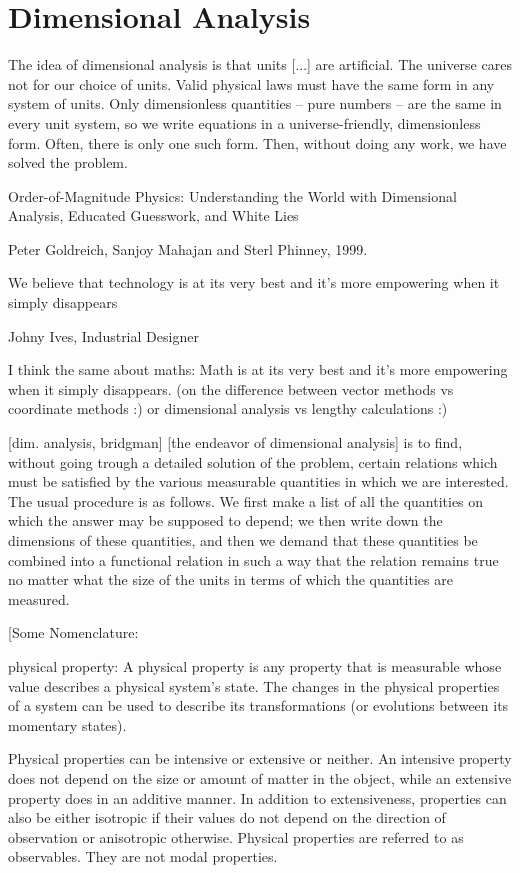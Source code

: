 \section{Dimensional Analysis}

\epigraph{The idea of dimensional analysis is that units [...] are artificial. The universe cares not for our choice of units. Valid physical laws must have the same form in any system of units. Only dimensionless quantities -- pure numbers -- are the same in every unit system, so we write equations in a universe-friendly, dimensionless form. Often, there is only one such form. Then, without doing any work, we have solved the problem.}
{Order-of-Magnitude Physics: Understanding the World with Dimensional Analysis, Educated Guesswork, and White Lies}
{Peter Goldreich, Sanjoy Mahajan and Sterl Phinney, 1999.}

\epigraph{We believe that technology is at its very best and it's more empowering when it simply disappears}
{Johny Ives, Industrial Designer}{}

I think the same about maths: Math is at its very best and it's more empowering when it simply disappears. (on the difference between vector methods vs coordinate methods :) or dimensional analysis vs lengthy calculations :)

[dim. analysis, bridgman]
[the endeavor of dimensional analysis] is to find, without going trough a detailed solution of the problem, certain relations which must be satisfied by the various measurable quantities in which we are interested. The usual procedure is as follows. We first make a list of all the quantities on which the answer may be supposed to depend; we then write down the dimensions of these quantities, and then we demand that these quantities be combined into a functional relation in such a way that the relation remains true no matter what the size of the units in terms of which the quantities are measured.


[Some Nomenclature:

physical property: A physical property is any property that is measurable whose value describes a physical system's state. The changes in the physical properties of a system can be used to describe its transformations (or evolutions between its momentary states).

Physical properties can be intensive or extensive or neither. An intensive property does not depend on the size or amount of matter in the object, while an extensive property does in an additive manner. In addition to extensiveness, properties can also be either isotropic if their values do not depend on the direction of observation or anisotropic otherwise. Physical properties are referred to as observables. They are not modal properties.

